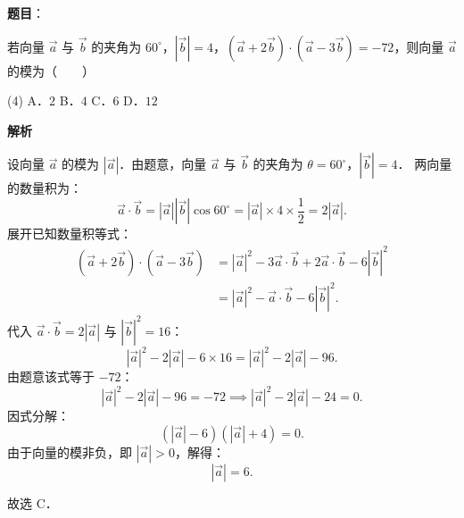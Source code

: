 \begin{answer}

\textbf{题目}：

若向量 $\vec{a}$ 与 $\vec{b}$ 的夹角为 $60^\circ$，$|\vec{b}| = 4$，$(\vec{a} + 2\vec{b}) \cdot (\vec{a} - 3\vec{b}) = -72$，则向量 $\vec{a}$ 的模为\mbox{（　　）}

\begin{gkopts}(4)
\task A．$2$
\task B．$4$
\task C．$6$
\task D．$12$
\end{gkopts}

\textbf{解析}

设向量 $\vec{a}$ 的模为 $|\vec{a}|$．由题意，向量 $\vec{a}$ 与 $\vec{b}$ 的夹角为 $\theta = 60^\circ$，$|\vec{b}| = 4$．
两向量的数量积为：
\nopagebreak[4]
\[
\vec{a} \cdot \vec{b} = |\vec{a}| |\vec{b}| \cos 60^\circ = |\vec{a}| \times 4 \times \frac{1}{2} = 2|\vec{a}|.
\]
展开已知数量积等式：
\nopagebreak[4]
\[
\begin{aligned}
(\vec{a} + 2\vec{b}) \cdot (\vec{a} - 3\vec{b}) &= |\vec{a}|^2 - 3\vec{a} \cdot \vec{b} + 2\vec{a} \cdot \vec{b} - 6|\vec{b}|^2 \\
&= |\vec{a}|^2 - \vec{a} \cdot \vec{b} - 6|\vec{b}|^2.
\end{aligned}
\]
代入 $\vec{a} \cdot \vec{b} = 2|\vec{a}|$ 与 $|\vec{b}|^2 = 16$：
\nopagebreak[4]
\[
|\vec{a}|^2 - 2|\vec{a}| - 6 \times 16 = |\vec{a}|^2 - 2|\vec{a}| - 96.
\]
由题意该式等于 $-72$：
\nopagebreak[4]
\[
|\vec{a}|^2 - 2|\vec{a}| - 96 = -72 \implies |\vec{a}|^2 - 2|\vec{a}| - 24 = 0.
\]
因式分解：
\nopagebreak[4]
\[
(|\vec{a}| - 6)(|\vec{a}| + 4) = 0.
\]
由于向量的模非负，即 $|\vec{a}| > 0$，解得：
\nopagebreak[4]
\[
|\vec{a}| = 6.
\]

故选 C．


\end{answer}
